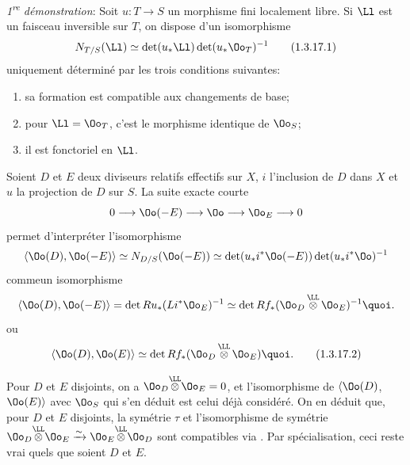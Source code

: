 \emph{1\textsuperscript{re} démonstration}: Soit $u:T\rightarrow S$ un morphisme
fini localement libre. Si $\Ll$ est un faisceau inversible sur
$T$, on dispose d'un isomorphisme
\begin{equation*}
N_{T/S}(\Ll)\simeq \det(u_{\ast}\Ll)\det(u_{\ast}\Oo_{T})^{-1}\tag{1.3.17.1}
\end{equation*}%
uniquement déterminé par les trois conditions suivantes:
\begin{enumerate}
\renewcommand{\theenumi}{\alph{enumi}}
\renewcommand{\labelenumi}{\theenumi)}
\item sa formation est compatible aux changements de base;

\item pour $\Ll=\Oo_{T}$, c'est le morphisme identique de
$\Oo_{S}$;

\item il est fonctoriel en $\Ll$.
\end{enumerate}

Soient $D$ et $E$ deux diviseurs relatifs effectifs sur $X$, $i$
l'inclusion de $D$ dans $X$ et $u$ la projection de $D$ sur $S$. La
suite exacte courte
$$
0\longrightarrow \Oo (-E)\longrightarrow \Oo\longrightarrow
\Oo_{E}\longrightarrow 0
$$
permet d'interpréter l'isomorphisme
$$
\langle \Oo(D),\Oo(-E)\rangle \simeq N_{D/S}(\Oo(-E))\simeq
\det(u_{\ast}i^{\ast}\Oo(-E))\det (u_{\ast}i^{\ast}\Oo)^{-1}
$$
comme\pageoriginale un isomorphisme
$$
\langle \Oo(D),\Oo(-E)\rangle =\det Ru_{\ast}(Li^{\ast}\Oo_{E})^{-1}\simeq
\det Rf_{\ast}(\Oo_{D}\mathop{\otimes}^{\LL}
\Oo_{E})^{-1}{\quoi}.
$$
ou
\begin{equation*}
\langle \Oo(D),\Oo(E)\rangle \simeq \det Rf_{\ast}(\Oo_{D}\mathop{\otimes}^{\LL}\Oo_{E}){\quoi}.\tag{1.3.17.2}
\end{equation*}

Pour $D$ et $E$ disjoints, on a
$\Oo_{D}\displaystyle{\mathop{\otimes}^{\LL}}\Oo_{E}=0$, et
l'isomorphisme de $\langle \Oo(D)$, $\Oo(E)\rangle $ avec $\Oo_{S}$
qui s'en déduit est celui déjà considéré. On en déduit que, pour $D$
et $E$ disjoints, la symétrie $\tau$ et l'isomorphisme de symétrie
$\Oo_{D}\displaystyle{\mathop{\otimes}^{\LL}}\Oo_{E}\xrightarrow{\sim}\Oo_{E}\displaystyle{\mathop{\otimes}^{\LL}}\Oo_{D}$
sont compatibles via . Par spécialisation,
ceci reste vrai quels que soient $D$ et $E$.

